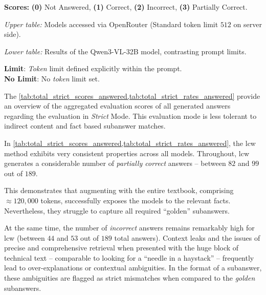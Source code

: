 \begin{table}[H]
\begin{threeparttable}
        \begin{tablenotes}\footnotesize
            \item \textbf{Scores:} \textbf{(0)} Not Answered, \textbf{(1)} Correct, \textbf{(2)} Incorrect, \textbf{(3)} Partially Correct.
            \item \textit{Upper table:} Models accessed via OpenRouter (Standard token limit $512$ on server side).
            \item \textit{Lower table:} Results of the Qwen3-VL-32B model, contrasting prompt limits.
            \item \textbf{Limit}: \textit{Token} limit defined explicitly within the prompt.\\ \textbf{No Limit}: No \textit{token} limit set.
        \end{tablenotes}
    \end{threeparttable}
\end{table}

\vspace{1cm}

The \cref{tab:total_strict_scores_answered,tab:total_strict_rates_answered} provide an overview of the aggregated evaluation scores of all generated answers regarding the evaluation in \textit{Strict} Mode.
This evaluation mode is less tolerant to indirect content and fact based subanswer matches.
%

In \cref{tab:total_strict_scores_answered,tab:total_strict_rates_answered}, the \ac{lcw} method exhibits very consistent properties across all models.
Throughout, \ac{lcw} generates a considerable number of \textit{partially correct} answers -- between $82$ and $99$ out of $189$.

This demonstrates that augmenting with the entire textbook, comprising $\approx 120,000$ tokens, successfully exposes the models to the relevant facts.
Nevertheless, they struggle to capture all required \enquote{golden} subanswers.

At the same time, the number of \textit{incorrect} answers remains remarkably high for \ac{lcw} (between $44$ and $53$ out of $189$ total answers).
Context leaks and the issues of precise and comprehensive retrieval when presented with the huge block of technical text -- comparable to looking for a \enquote{needle in a haystack} -- frequently lead to over-explanations or contextual ambiguities.
In the format of a subanswer, these ambiguities are flagged as strict mismatches when compared to the \textit{golden} subanswers.

